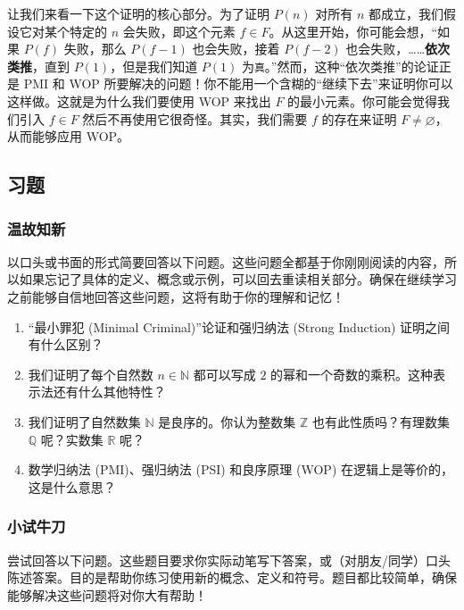 让我们来看一下这个证明的核心部分。为了证明 $P(n)$ 对所有 $n$ 都成立，我们假设它对某个特定的 $n$ 会失败，即这个元素 $f \in F$。从这里开始，你可能会想，``如果 $P(f)$ 失败，那么 $P(f-1)$ 也会失败，接着 $P(f-2)$ 也会失败，……\textbf{依次类推}，直到 $P(1)$，但是我们知道 $P(1)$ 为\verb|真|。''然而，这种``依次类推''的论证正是 PMI 和 WOP 所要解决的问题！你不能用一个含糊的``继续下去''来证明你可以这样做。这就是为什么我们要使用 WOP 来找出 $F$ 的最小元素。你可能会觉得我们引入 $f \in F$ 然后不再使用它很奇怪。其实，我们需要 $f$ 的存在来证明 $F \ne \varnothing$，从而能够应用 WOP。

\subsection{习题}

\subsubsection*{温故知新}

以口头或书面的形式简要回答以下问题。这些问题全都基于你刚刚阅读的内容，所以如果忘记了具体的定义、概念或示例，可以回去重读相关部分。确保在继续学习之前能够自信地回答这些问题，这将有助于你的理解和记忆！

\begin{enumerate}[label=(\arabic*)]
    \item ``最小罪犯 (Minimal Criminal)''论证和强归纳法 (Strong Induction) 证明之间有什么区别？
    \item 我们证明了每个自然数 $n \in \mathbb{N}$ 都可以写成 $2$ 的幂和一个奇数的乘积。这种表示法还有什么其他特性？
    \item 我们证明了自然数集 $\mathbb{N}$ 是良序的。你认为整数集 $\mathbb{Z}$ 也有此性质吗？有理数集 $\mathbb{Q}$ 呢？实数集 $\mathbb{R}$ 呢？
    \item 数学归纳法 (PMI)、强归纳法 (PSI) 和良序原理 (WOP) 在逻辑上是等价的，这是什么意思？
\end{enumerate}

\subsubsection*{小试牛刀}

尝试回答以下问题。这些题目要求你实际动笔写下答案，或（对朋友/同学）口头陈述答案。目的是帮助你练习使用新的概念、定义和符号。题目都比较简单，确保能够解决这些问题将对你大有帮助！

